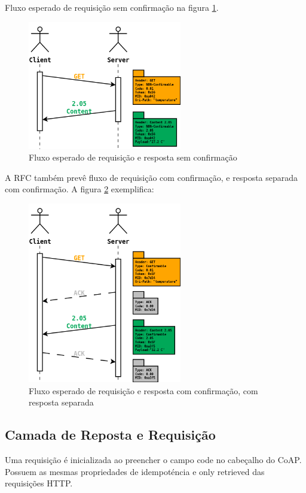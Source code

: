 Fluxo esperado de requisi\c{c}\~ao sem confirma\c{c}\~ao na figura \ref{nonConfirmable}.
\begin{figure}[h]
   \label{nonConfirmable}
   \centering
   \includegraphics[width=0.6\textwidth]{figuras/nonconfirmable.png}
   \caption{Fluxo esperado de requisi\c{c}\~ao e resposta sem confirma\c{c}\~ao}
\end{figure}

A RFC tamb\'em prev\^e fluxo de requisi\c{c}\~ao com confirma\c{c}\~ao, e resposta separada com confirma\c{c}\~ao. A figura \ref{separateResponse} exemplifica:

\begin{figure}[h]
   \label{separateResponse}
   \centering
   \includegraphics[width=0.6\textwidth]{figuras/separateresponse.png}
   \caption{Fluxo esperado de requisi\c{c}\~ao e resposta com confirma\c{c}\~ao, com resposta separada}
\end{figure}

\subsection{Camada de Reposta e Requisi\c{c}\~ao}
Uma requisi\c{c}\~ao \'e inicializada ao preencher o campo code no cabe\c{c}alho do CoAP. Possuem as mesmas propriedades de idempot\'encia e only retrieved das requisi\c{c}\~oes HTTP.

